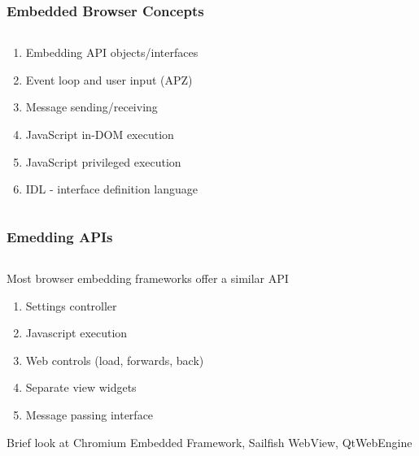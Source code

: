 \documentclass[
	notes=none,
	aspectratio=169
]{beamer}
\begin{document}
\begin{frame}
\frametitle{Embedded Browser Concepts}

\begin{columns}[T]
\begin{column}[T]{1.0\textwidth}
\setlength{\parskip}{0.5em}

\vspace{1.0cm}
\begin{enumerate}
\setlength{\parskip}{0.5em}
\item Embedding API objects/interfaces
\item Event loop and user input (APZ)
\item Message sending/receiving
\item JavaScript in-DOM execution
\item JavaScript privileged execution
\item IDL - interface definition language
\end{enumerate}

\end{column}
\end{columns}

\end{frame}
\note{
\begin{enumerate}
\item -
\end{enumerate}
}


\begin{frame}
\frametitle{Emedding APIs}

\begin{columns}[T]
\begin{column}[T]{1.0\textwidth}
\setlength{\parskip}{0.5em}

\vspace{1.0cm}
Most browser embedding frameworks offer a similar API
\begin{enumerate}
\setlength{\parskip}{0.5em}
\item Settings controller
\item Javascript execution
\item Web controls (load, forwards, back)
\item Separate view widgets
\item Message passing interface
\end{enumerate}
Brief look at Chromium Embedded Framework, Sailfish WebView, QtWebEngine
\end{column}
\end{columns}

\end{frame}
\note{
\begin{enumerate}
\item -
\end{enumerate}
}
\end{document}
